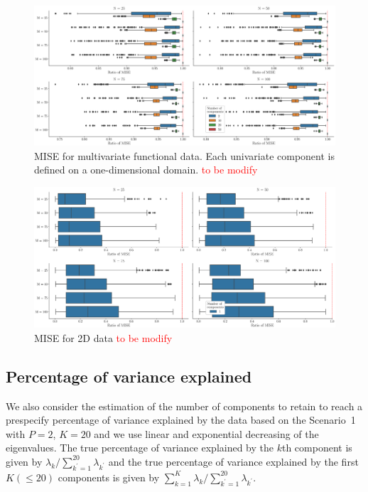 \begin{results}

\begin{figure}
    \centering
    \includegraphics[scale=0.25]{figures/mise_pall.eps}
    \caption{MISE for multivariate functional data. Each univariate component is defined on a one-dimensional domain. \textcolor{red}{to be modify}}
    \label{fig:mise_mfd_1d}
\end{figure}

\begin{figure}
    \centering
    \includegraphics[scale=0.25]{figures/mise_p1.eps}
    \caption{MISE for 2D data \textcolor{red}{to be modify}}
    \label{fig:mise_fd_2d}
\end{figure}

\end{results}



\subsection{Percentage of variance explained} %
\label{sub:percentage_of_variance_explained_simulation}

We also consider the estimation of the number of components to retain to reach a prespecify percentage of variance explained by the data based on the Scenario~1 with $P = 2$, $K = 20$ and we use linear and exponential decreasing of the eigenvalues. The true percentage of variance explained by the $k$th component is given by $\lambda_k / \sum_{k^\prime = 1}^{20} \lambda_{k^\prime}$ and the true percentage of variance explained by the first $K (\leq 20)$ components is given by $\sum_{k = 1}^K \lambda_k / \sum_{k^\prime = 1}^{20} \lambda_{k^\prime}$.

